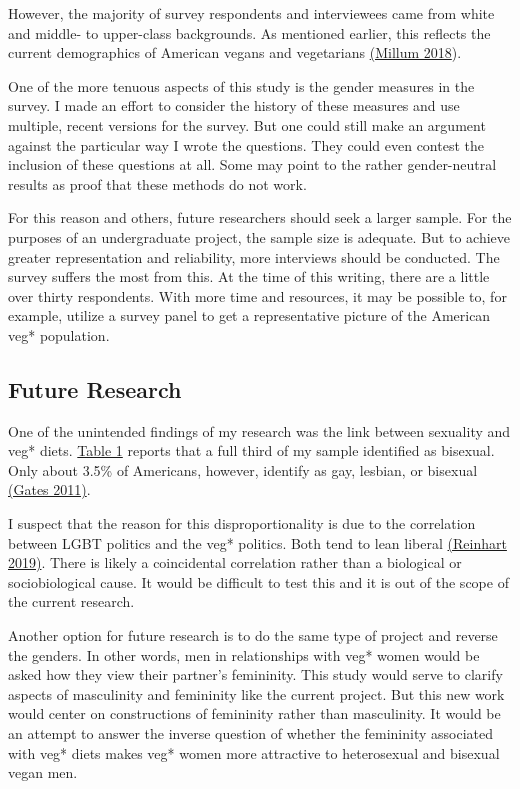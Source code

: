 \documentclass[twoside]{report}
\begin{document}
However, the majority of survey respondents and interviewees came from
white and middle- to upper-class backgrounds. As mentioned earlier, this reflects the current demographics of American vegans and vegetarians \hyperlink{millum}{(Millum 2018}).

One of the more tenuous aspects of this study is the gender measures in
the survey. I made an effort to consider the history of these measures
and use multiple, recent versions for the survey. But one could still
make an argument against the particular way I wrote the questions. They
could even contest the inclusion of these questions at all. Some may
point to the rather gender-neutral results as proof that these methods
do not work.

For this reason and others, future researchers should seek a larger
sample. For the purposes of an undergraduate project, the sample size is
adequate. But to achieve greater representation and reliability, more
interviews should be conducted. The survey suffers the most from this.
At the time of this writing, there are a little over thirty respondents. 
With more time and resources, it may be possible to, for example, utilize a survey
panel to get a representative picture of the American veg* population.

\hypertarget{future-research}{\subsection{Future Research}}

One of the unintended findings of my research was the link between
sexuality and veg* diets. \hyperlink{table-1}{Table 1} reports that a full third of my sample identified as bisexual. Only about 3.5\% of Americans, however, identify as gay, lesbian, or bisexual \hyperlink{gates}{(Gates 2011)}. 

I suspect that the reason for this disproportionality is due to the correlation between LGBT politics and the veg* politics. Both tend to lean liberal \hyperlink{reinhart}{(Reinhart 2019)}. There is likely a coincidental correlation rather than a biological or sociobiological cause. It would be difficult to test this and it is out of the scope of the current research.

Another option for future research is to do the same type of project and reverse the genders. In other words, men in relationships with
veg* women would be asked how they view their partner's femininity. This
study would serve to clarify aspects of masculinity and femininity
like the current project. But this new work would center on
constructions of femininity rather than masculinity. It would be an
attempt to answer the inverse question of whether the femininity
associated with veg* diets makes veg* women more attractive to
heterosexual and bisexual vegan men.
\end{document}
